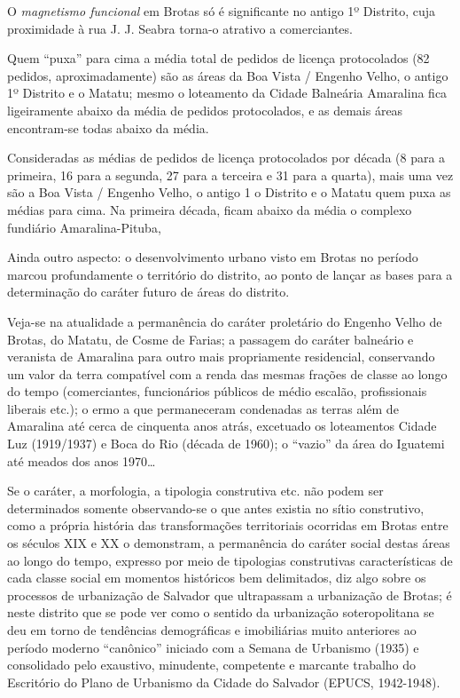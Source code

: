O \textit{magnetismo funcional} em Brotas só é significante no antigo 1º Distrito, cuja proximidade à rua J. J. Seabra torna-o atrativo a comerciantes.

Quem ``puxa'' para cima a média total de pedidos de licença protocolados (82 pedidos, aproximadamente) são as áreas da Boa Vista / Engenho Velho, o antigo 1º Distrito e o Matatu; mesmo o loteamento da Cidade Balneária Amaralina fica ligeiramente abaixo da média de pedidos protocolados, e as demais áreas encontram-se todas abaixo da média.

Consideradas as médias de pedidos de licença protocolados por década (8 para a primeira, 16 para a segunda, 27 para a terceira e 31 para a quarta), mais uma vez são a Boa Vista / Engenho Velho, o antigo 1 o Distrito e o Matatu quem puxa as médias para cima. Na primeira década, ficam abaixo da média o complexo fundiário Amaralina-Pituba, 

Ainda outro aspecto: o desenvolvimento urbano visto em Brotas no período marcou profundamente o território do distrito, ao ponto de lançar as bases para a determinação do caráter futuro de áreas do distrito.

Veja-se na atualidade a permanência do caráter proletário do Engenho Velho de Brotas, do Matatu, de Cosme de Farias; a passagem do caráter balneário e veranista de Amaralina para outro mais propriamente residencial, conservando um valor da terra compatível com a renda das mesmas frações de classe ao longo do tempo (comerciantes, funcionários públicos de médio escalão, profissionais liberais etc.); o ermo a que permaneceram condenadas as terras além de Amaralina até cerca de cinquenta anos atrás, excetuado os loteamentos Cidade Luz (1919/1937) e Boca do Rio (década de 1960); o ``vazio'' da área do Iguatemi até meados dos anos 1970\dots

Se o caráter, a morfologia, a tipologia construtiva etc. não podem ser determinados somente observando-se o que antes existia no sítio construtivo, como a própria história das transformações territoriais ocorridas em Brotas entre os séculos XIX e XX o demonstram, a permanência do caráter social destas áreas ao longo do tempo, expresso por meio de tipologias construtivas características de cada classe social em momentos históricos bem delimitados, diz algo sobre os processos de urbanização de Salvador que ultrapassam a urbanização de Brotas; é neste distrito que se pode ver como o sentido da urbanização soteropolitana se deu em torno de tendências demográficas e imobiliárias muito anteriores ao período moderno ``canônico'' iniciado com a Semana de Urbanismo (1935) e consolidado pelo exaustivo, minudente, competente e marcante trabalho do Escritório do Plano de Urbanismo da Cidade do Salvador (EPUCS, 1942-1948).

